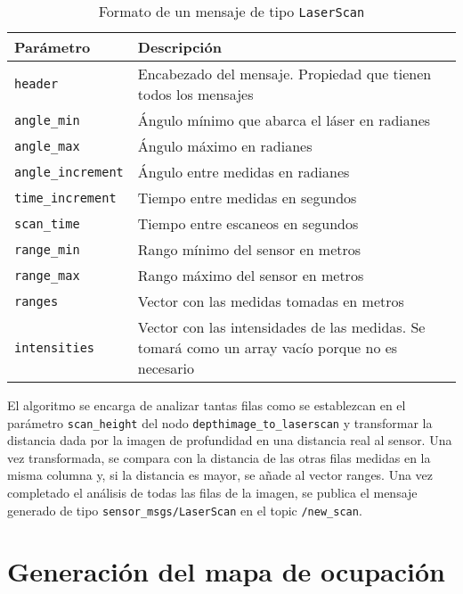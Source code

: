 \begin{table}[H]
\begin{center}
\begin{tabular}{| w{c}{4cm} | m{6.5cm} |}
	\hline
	Parámetro & Descripción \\ \hline
	\texttt{header} & Encabezado del mensaje. Propiedad que tienen todos los mensajes \\ \hline
	\texttt{angle\_min} & Ángulo mínimo que abarca el láser en radianes \\ \hline
	\texttt{angle\_max} & Ángulo máximo en radianes \\ \hline
	\texttt{angle\_increment} & Ángulo entre medidas en radianes \\ \hline
	\texttt{time\_increment} & Tiempo entre medidas en segundos \\ \hline
	\texttt{scan\_time} & Tiempo entre escaneos en segundos \\ \hline
	\texttt{range\_min} & Rango mínimo del sensor en metros \\ \hline
	\texttt{range\_max} & Rango máximo del sensor en metros \\ \hline
	\texttt{ranges} & Vector con las medidas tomadas en metros \\ \hline
	\texttt{intensities} & Vector con las intensidades de las medidas. Se tomará como un array vacío porque no es necesario \\ \hline
\end{tabular}
\caption{Formato de un mensaje de tipo \texttt{LaserScan}}
\label{tab:laserscan_msg}
\end{center}
\end{table} 

El algoritmo se encarga de analizar tantas filas como se establezcan en el parámetro \texttt{scan\_height} del nodo \texttt{depthimage\_to\_laserscan} y transformar la distancia dada por la imagen de profundidad en una distancia real al sensor. Una vez transformada, se compara con la distancia de las otras filas medidas en la misma columna y, si la distancia es mayor, se añade al vector ranges. Una vez completado el análisis de todas las filas de la imagen, se publica el mensaje generado de tipo \texttt{sensor\_msgs/LaserScan} en el topic \texttt{/new\_scan}.\\

\section{Generación del mapa de ocupación} \label{mapa_ocup}

